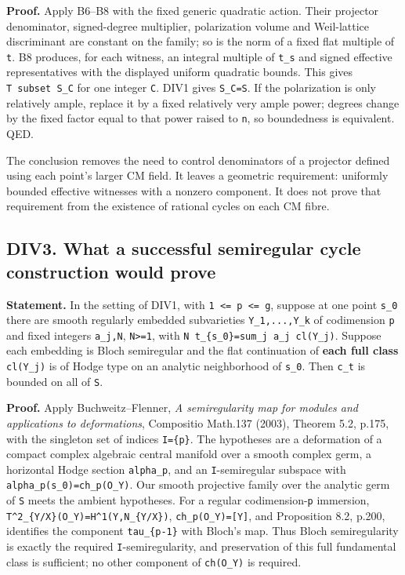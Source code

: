 \documentclass[11pt,a4paper]{article}
\theoremstyle{definition}
\begin{document}
\textbf{Proof.} Apply B6--B8 with the fixed generic quadratic action.
Their projector denominator, signed-degree multiplier, polarization
volume and Weil-lattice discriminant are constant on the family; so is
the norm of a fixed flat multiple of \texttt{t}. B8 produces, for each
witness, an integral multiple of \texttt{t\_s} and signed effective
representatives with the displayed uniform quadratic bounds. This gives
\texttt{T\ subset\ S\_C} for one integer \texttt{C}. DIV1 gives
\texttt{S\_C=S}. If the polarization is only relatively ample, replace
it by a fixed relatively very ample power; degrees change by the fixed
factor equal to that power raised to \texttt{n}, so boundedness is
equivalent. QED.

The conclusion removes the need to control denominators of a projector
defined using each point's larger CM field. It leaves a geometric
requirement: uniformly bounded effective witnesses with a nonzero
component. It does not prove that requirement from the existence of
rational cycles on each CM fibre.

\subsection{DIV3. What a successful semiregular cycle construction would
prove}\label{div3.-what-a-successful-semiregular-cycle-construction-would-prove}

\textbf{Statement.} In the setting of DIV1, with
\texttt{1\ \textless{}=\ p\ \textless{}=\ g}, suppose at one point
\texttt{s\_0} there are smooth regularly embedded subvarieties
\texttt{Y\_1,...,Y\_k} of codimension \texttt{p} and fixed integers
\texttt{a\_j,N}, \texttt{N\textgreater{}=1}, with
\texttt{N\ t\_\{s\_0\}=sum\_j\ a\_j\ cl(Y\_j)}. Suppose each embedding
is Bloch semiregular and the flat continuation of \textbf{each full
class} \texttt{cl(Y\_j)} is of Hodge type on an analytic neighborhood of
\texttt{s\_0}. Then \texttt{c\_t} is bounded on all of \texttt{S}.

\textbf{Proof.} Apply Buchweitz--Flenner, \emph{A semiregularity map for
modules and applications to deformations}, Compositio Math.137 (2003),
Theorem 5.2, p.175, with the singleton set of indices \texttt{I=\{p\}}.
The hypotheses are a deformation of a compact complex algebraic central
manifold over a smooth complex germ, a horizontal Hodge section
\texttt{alpha\_p}, and an \texttt{I}-semiregular subspace with
\texttt{alpha\_p(s\_0)=ch\_p(O\_Y)}. Our smooth projective family over
the analytic germ of \texttt{S} meets the ambient hypotheses. For a
regular codimension-\texttt{p} immersion,
\texttt{T\^{}2\_\{Y/X\}(O\_Y)=H\^{}1(Y,N\_\{Y/X\})},
\texttt{ch\_p(O\_Y)={[}Y{]}}, and Proposition 8.2, p.200, identifies the
component \texttt{tau\_\{p-1\}} with Bloch's map. Thus Bloch
semiregularity is exactly the required \texttt{I}-semiregularity, and
preservation of this full fundamental class is sufficient; no other
component of \texttt{ch(O\_Y)} is required.
\end{document}
